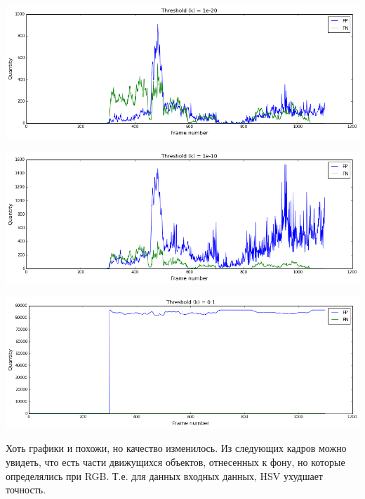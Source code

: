 \documentclass[12pt, a4paper]{article}
\begin{document}
			\begin{center}
				\includegraphics[width=17cm]{3_par_hsv_k_1e-20.png}
			\end{center}
			\begin{center}
				\includegraphics[width=17cm]{3_par_hsv_k_1e-10.png}
			\end{center}
			\begin{center}
				\includegraphics[width=17cm]{3_par_hsv_k_0_1.png}
			\end{center}

			Хоть графики и похожи, но качество изменилось. Из следующих кадров можно увидеть, что есть части движущихся объектов, отнесенных к фону, но которые определялись при RGB. Т.е. для данных входных данных, HSV ухудшает точность.
			
\end{document}
